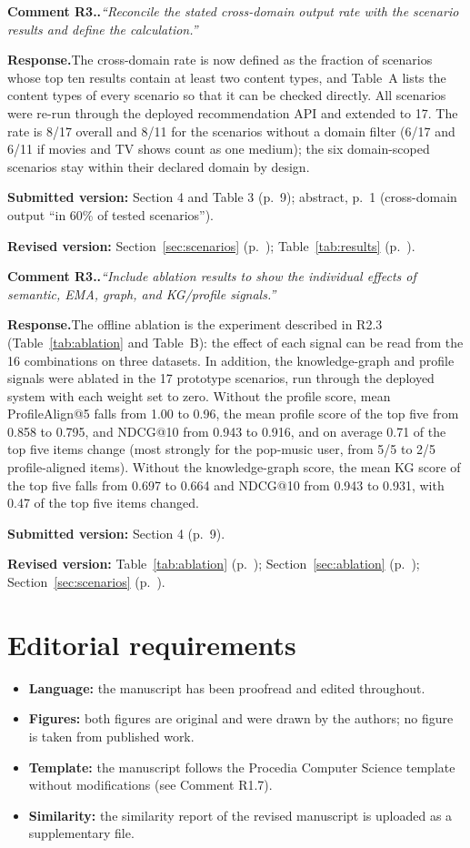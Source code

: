 \documentclass[10pt]{article}
\newcounter{rc}
\newcommand{\point}[2]{\stepcounter{rc}%
  \par\medskip\noindent\textbf{Comment #1.\arabic{rc}.}\enspace\textit{``#2''}\par}
\newcommand{\response}{\noindent\textbf{Response.}\enspace}
\newcommand{\where}[2]{\par\noindent\textbf{Submitted version:} #1\par\noindent\textbf{Revised version:} #2\par}
\newcommand{\sect}[1]{Section~\ref{#1} (p.~\pageref{#1})}
\newcommand{\tabl}[1]{Table~\ref{#1} (p.~\pageref{#1})}
\begin{document}
\point{R3}{Reconcile the stated cross-domain output rate with the scenario results and define the calculation.}
\response The cross-domain rate is now defined as the fraction of scenarios whose top ten results contain at least two content types, and Table~A lists the content types of every scenario so that it can be checked directly. All scenarios were re-run through the deployed recommendation API and extended to 17. The rate is 8/17 overall and 8/11 for the scenarios without a domain filter (6/17 and 6/11 if movies and TV shows count as one medium); the six domain-scoped scenarios stay within their declared domain by design.
\where{Section 4 and Table 3 (p.~9); abstract, p.~1 (cross-domain output ``in 60\% of tested scenarios'').}{\sect{sec:scenarios}; \tabl{tab:results}.}

\point{R3}{Include ablation results to show the individual effects of semantic, EMA, graph, and KG/profile signals.}
\response The offline ablation is the experiment described in R2.3 (Table~\ref{tab:ablation} and Table~B): the effect of each signal can be read from the 16 combinations on three datasets. In addition, the knowledge-graph and profile signals were ablated in the 17 prototype scenarios, run through the deployed system with each weight set to zero. Without the profile score, mean ProfileAlign@5 falls from 1.00 to 0.96, the mean profile score of the top five from 0.858 to 0.795, and NDCG@10 from 0.943 to 0.916, and on average 0.71 of the top five items change (most strongly for the pop-music user, from 5/5 to 2/5 profile-aligned items). Without the knowledge-graph score, the mean KG score of the top five falls from 0.697 to 0.664 and NDCG@10 from 0.943 to 0.931, with 0.47 of the top five items changed.
\where{Section 4 (p.~9).}{\tabl{tab:ablation}; \sect{sec:ablation}; \sect{sec:scenarios}.}

\section*{Editorial requirements}
\begin{itemize}
  \item \textbf{Language:} the manuscript has been proofread and edited throughout.
  \item \textbf{Figures:} both figures are original and were drawn by the authors; no figure is taken from published work.
  \item \textbf{Template:} the manuscript follows the Procedia Computer Science template without modifications (see Comment R1.7).
  \item \textbf{Similarity:} the similarity report of the revised manuscript is uploaded as a supplementary file.
\end{itemize}
\end{document}
